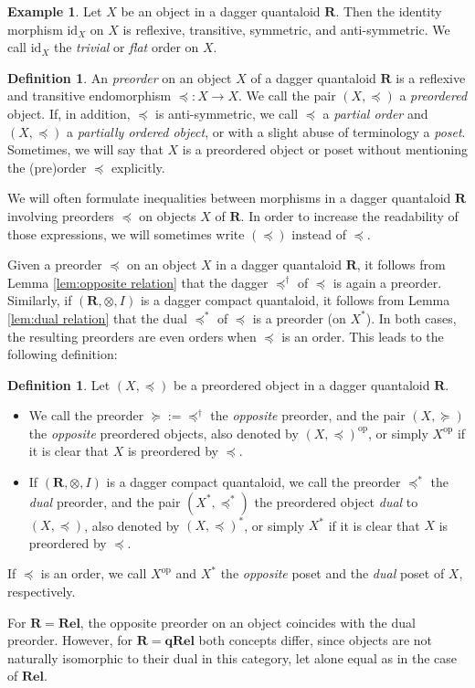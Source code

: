 \documentclass[12pt]{tac}
\theoremstyle{definition}
\newtheorem{definition}[theorem]{Definition}
\newtheorem{example}[theorem]{Example}
\theoremstyle{remark}
\newcommand{\qo}{{\boldsymbol{\preccurlyeq}}}
\newcommand{\qop}{{\boldsymbol{\succcurlyeq}}}
\newcommand{\<}{\langle}
\renewcommand{\>}{\rangle}
\renewcommand{\:}{\colon}
\newcommand{\op}{\mathrm{op}}
\newcommand{\id}{\mathrm{id}}
\begin{document}
\begin{example}\label{ex:trivial order}
    Let $X$ be an object in a dagger quantaloid $\mathbf R$. Then the identity morphism $\id_X$ on $X$ is reflexive, transitive, symmetric, and anti-symmetric. We call $\id_X$ the \emph{trivial} or \emph{flat} order on  $X$.
\end{example}


\begin{definition}
An \emph{preorder} on an object $X$ of a dagger quantaloid $\mathbf R$ is a reflexive and transitive endomorphism $\qo:X\to X$. We call the pair $(X,\qo)$ a \emph{preordered} object.
If, in addition, $\qo$ is anti-symmetric, we call $\qo$ a \emph{partial order} and $(X,\qo)$ a \emph{partially ordered object}, or with a slight abuse of terminology a \emph{poset}. Sometimes, we will say that $X$ is a preordered object or poset without mentioning the (pre)order $\qo$ explicitly. 
\end{definition}
We will often formulate inequalities between morphisms in a dagger quantaloid $\mathbf R$ involving preorders $\qo$ on objects $X$ of $\mathbf R$. In order to increase the readability of those expressions, we will sometimes write $(\qo)$ instead of $\qo$.


Given a preorder $\qo$ on an object $X$ in a dagger quantaloid $\mathbf R$, it follows from Lemma \ref{lem:opposite relation} that the dagger $\qo^\dag$ of $\qo$ is again a preorder. Similarly, if $(\mathbf R,\otimes,I)$ is a dagger compact quantaloid, it follows from Lemma \ref{lem:dual relation} that the dual $\qo^*$ of $\qo$ is a preorder (on $X^*$). In both cases, the resulting preorders are even orders when $\qo$ is an order. This leads to the following definition:  
\begin{definition}
    Let $(X,\qo)$ be a preordered object in a dagger quantaloid $\mathbf R$. 
    \begin{itemize}
        \item We call the preorder $\qop:=\qo^\dag$ the \emph{opposite} preorder, and the pair $(X,\qop)$ the \emph{opposite} preordered objects, also denoted by $(X,\qo)^\op$, or simply $X^\op$ if it is clear that $X$ is preordered by $\qo$.
        \item If $(\mathbf R,\otimes,I)$ is a dagger compact quantaloid, we call the preorder $\qo^*$ the \emph{dual} preorder, and the pair $(X^*,\qo^*)$ the preordered object \emph{dual} to $(X,\qo)$, also denoted by $(X,\qo)^*$, or simply $X^*$ if it is clear that $X$ is preordered by $\qo$.
    \end{itemize}
    If $\qo$ is an order, we call $X^\op$ and $X^*$ the \emph{opposite} poset and the \emph{dual} poset of $X$, respectively. 
\end{definition}
For $\mathbf R=\mathbf{Rel}$, the opposite preorder on an object coincides with the dual preorder. However, for $\mathbf{R}=\mathbf{qRel}$ both concepts differ, since objects are not naturally isomorphic to their dual in this category, let alone equal as in the case of $\mathbf{Rel}$. 
\end{document}
